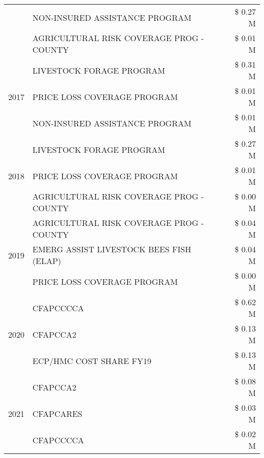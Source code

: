 \begin{tabular}{llr}
 & NON-INSURED ASSISTANCE PROGRAM                & \$ 0.27 M \\
 & AGRICULTURAL RISK COVERAGE PROG - COUNTY      & \$ 0.01 M \\
\cline{1-3}
\multirow[t]{3}{*}{2017} & LIVESTOCK FORAGE PROGRAM & \$ 0.31 M \\
 & PRICE LOSS COVERAGE PROGRAM & \$ 0.01 M \\
 & NON-INSURED ASSISTANCE PROGRAM & \$ 0.01 M \\
\cline{1-3}
\multirow[t]{3}{*}{2018} & LIVESTOCK FORAGE PROGRAM & \$ 0.27 M \\
 & PRICE LOSS COVERAGE PROGRAM & \$ 0.01 M \\
 & AGRICULTURAL RISK COVERAGE PROG - COUNTY & \$ 0.00 M \\
\cline{1-3}
\multirow[t]{3}{*}{2019} & AGRICULTURAL RISK COVERAGE PROG - COUNTY & \$ 0.04 M \\
 & EMERG ASSIST LIVESTOCK BEES FISH (ELAP) & \$ 0.04 M \\
 & PRICE LOSS COVERAGE PROGRAM & \$ 0.00 M \\
\cline{1-3}
\multirow[t]{3}{*}{2020} & CFAPCCCCA & \$ 0.62 M \\
 & CFAPCCA2 & \$ 0.13 M \\
 & ECP/HMC COST SHARE FY19 & \$ 0.13 M \\
\cline{1-3}
\multirow[t]{3}{*}{2021} & CFAPCCA2 & \$ 0.08 M \\
 & CFAPCARES & \$ 0.03 M \\
 & CFAPCCCCA & \$ 0.02 M \\
\cline{1-3}
\bottomrule
\end{tabular}
